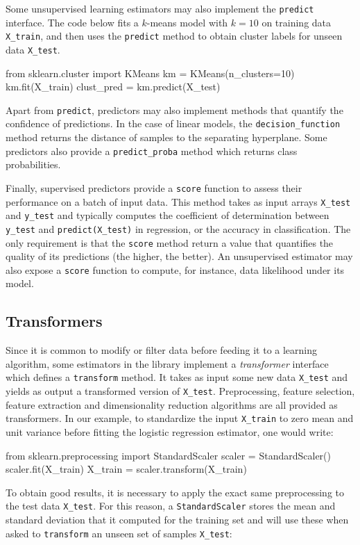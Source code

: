 \documentclass[twocolumn]{article}
\begin{document}
Some unsupervised learning estimators may also implement the \texttt{predict}
interface. The code below fits a $k$-means model with $k=10$ on
training data \texttt{X\_train}, and then uses the  \texttt{predict} method to
obtain cluster labels for unseen data \texttt{X\_test}.
\begin{pythoncode}
from sklearn.cluster import KMeans
km = KMeans(n_clusters=10)
km.fit(X_train)
clust_pred = km.predict(X_test)
\end{pythoncode}

Apart from \texttt{predict}, predictors may also implement methods
that quantify the confidence of predictions. In the case of
linear models, the \texttt{decision\_function} method returns
the distance of samples to the separating hyperplane. Some
predictors also provide a \texttt{predict\_proba} method which returns
class probabilities.

Finally, supervised predictors provide a \texttt{score} function to assess their
performance on a batch of input data. This method
takes as input arrays \texttt{X\_test} and \texttt{y\_test} and typically
computes the coefficient of determination between \texttt{y\_test} and
\texttt{predict(X\_test)} in regression, or the accuracy
in classification.
The only requirement is that the \texttt{score} method return a value
that quantifies the quality of its predictions (the higher, the better).
An unsupervised estimator may also expose a \texttt{score} function
to compute, for instance, data likelihood under its model.

\subsection{Transformers}

Since it is common to modify or filter data before feeding it to a learning
algorithm, some estimators in the library implement a \textit{transformer}
interface which defines a \texttt{transform} method. It takes as input some new
data \texttt{X\_test} and yields as output a transformed version of
\texttt{X\_test}. Preprocessing, feature selection, feature extraction and dimensionality reduction
algorithms are all provided as transformers.  In our example,
to standardize the input \texttt{X\_train} to zero mean and unit variance
before fitting the logistic regression estimator, one would write:
\begin{small}
\begin{pythoncode}
from sklearn.preprocessing import StandardScaler
scaler = StandardScaler()
scaler.fit(X_train)
X_train = scaler.transform(X_train)
\end{pythoncode}
\end{small}
To obtain good results, it is necessary to apply the exact same preprocessing to the
test data \texttt{X\_test}.
For this reason, a \texttt{StandardScaler} stores the mean and standard deviation
that it computed for the training set
and will use these when asked to \texttt{transform}
an unseen set of samples \texttt{X\_test}:
\end{document}

